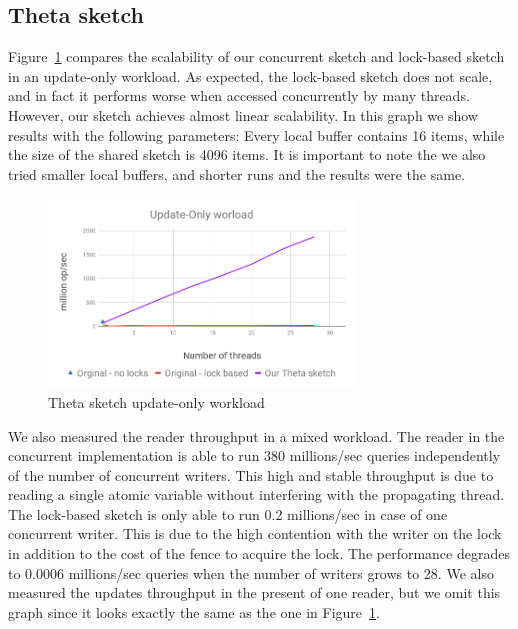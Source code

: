 \subsection{Theta sketch}
\label{sub:thetaExp}

Figure~\ref{fig:ConccurentTheta} compares the scalability
of our concurrent sketch and lock-based sketch in an update-only workload.
As expected, the lock-based sketch does not scale, and
in fact it performs worse when accessed concurrently by many
threads.
However, our sketch achieves almost linear scalability.
In this graph we show results with the following parameters:
Every local buffer contains 16 items, while the size of the
shared sketch is 4096 items.
It is important to note the we also tried smaller local buffers,
and shorter runs and the results were the same.

\begin{figure}[h]
  \centering
  \includegraphics*[width=3.2in]{images/concurrentThetaGraph}
  \caption{Theta sketch update-only workload}
   \label{fig:ConccurentTheta}
\end{figure}




We also measured the reader
throughput  in a mixed workload.
The reader in the concurrent implementation is able to run 380
millions/sec queries independently of the number of concurrent
writers. This high and stable throughput is due to reading a single atomic variable without interfering with the propagating thread.
The lock-based sketch is only able to run 0.2 millions/sec in case of one concurrent writer. This is due to the high contention with the writer on the lock in addition to the cost of the fence to acquire the lock.
The performance degrades to 0.0006 millions/sec queries when the
number of writers grows to 28.
We also measured the updates throughput in the present of one
reader, but we omit this graph since it looks exactly the same as
the one in Figure~\ref{fig:ConccurentTheta}.

